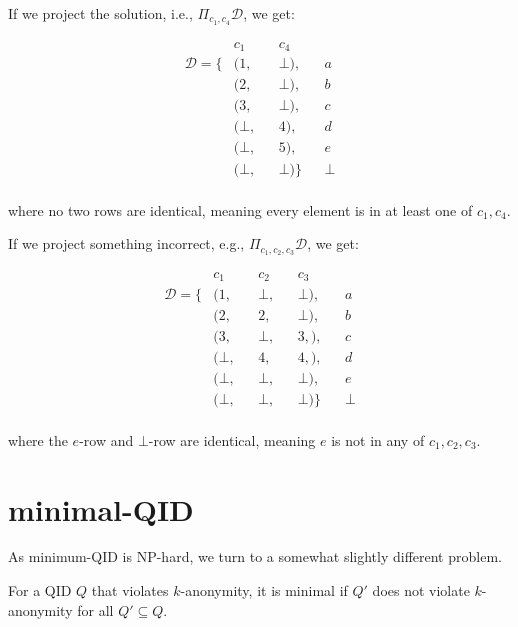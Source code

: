 \documentclass[12pt]{llncs}
\newcommand{\Proj}[1]{\Pi_{#1}}
\begin{document}
If we project the solution, i.e., $\Proj{c_1,c_4} \mathcal{D}$, we get:

\begin{align*}
                 &  c_1   && c_4     &&\\
\mathcal{D} = \{ & (1,    && \bot),  && a\\
                 & (2,    && \bot),  && b\\
                 & (3,    && \bot),  && c\\
                 & (\bot, && 4   ),  && d\\
                 & (\bot, && 5   ),  && e\\
                 & (\bot, && \bot)\} && \bot\\
\end{align*}

where no two rows are identical, meaning every element is in at least one of $c_1,c_4$.

If we project something incorrect, e.g., $\Proj{c_1,c_2,c_3} \mathcal{D}$, we get:

\begin{align*}
                 &  c_1   && c_2   && c_3     &&\\
\mathcal{D} = \{ & (1,    && \bot, && \bot),  && a\\
                 & (2,    && 2,    && \bot),  && b\\
                 & (3,    && \bot, && 3,  ),  && c\\
                 & (\bot, && 4,    && 4,  ),  && d\\
                 & (\bot, && \bot, && \bot),  && e\\
                 & (\bot, && \bot, && \bot)\} && \bot\\
\end{align*}

where the $e$-row and $\bot$-row are identical, meaning $e$ is not in any of $c_1,c_2,c_3$.

\section{minimal-QID}
As minimum-QID is NP-hard, we turn to a somewhat slightly different problem.

\begin{definition}
For a QID $Q$ that violates $k$-anonymity, it is minimal if $Q'$ does not violate $k$-anonymity for all $Q' \subseteq Q$.
\end{definition}
\end{document}
